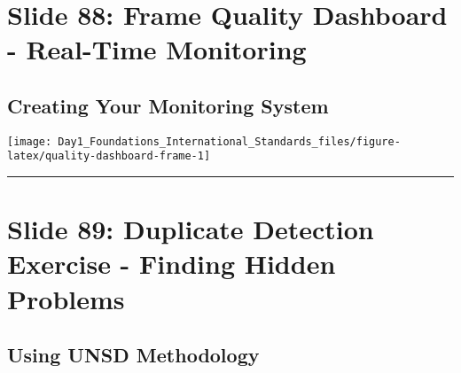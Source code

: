 \documentclass[
]{article}
\begin{document}
\section{Slide 88: Frame Quality Dashboard - Real-Time
Monitoring}\label{slide-88-frame-quality-dashboard---real-time-monitoring}

\subsection{Creating Your Monitoring
System}\label{creating-your-monitoring-system}

\texttt{[image: Day1\_Foundations\_International\_Standards\_files/figure-latex/quality-dashboard-frame-1]}

\begin{center}\rule{0.5\linewidth}{0.5pt}\end{center}

\section{Slide 89: Duplicate Detection Exercise - Finding Hidden
Problems}\label{slide-89-duplicate-detection-exercise---finding-hidden-problems}

\subsection{Using UNSD Methodology}\label{using-unsd-methodology}
\end{document}
